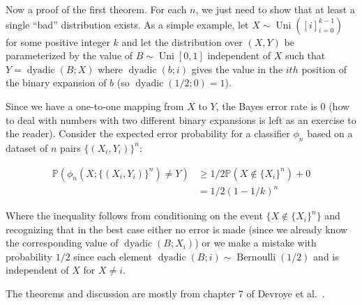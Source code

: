 \documentclass[12pt]{article}
\begin{document}
Now a proof of the first theorem. For each $n$, we just need to
show that at least a single ``bad'' distribution exists. As a simple
example, let $X \sim \operatorname{Uni}([i]_{i=0}^{k-1})$ for some
positive integer $k$ and let the distribution over $(X, Y)$ be parameterized by the
value of $B \sim \operatorname{Uni}[0, 1]$ independent of $X$ such that $Y =
\operatorname{dyadic}(B; X)$ where $\operatorname{dyadic}(b; i)$ gives
the value in the $ith$ position of the binary expansion of $b$ (so
$\operatorname{dyadic}(1/2; 0) = 1$).

Since we have a one-to-one mapping from $X$ to $Y$, the Bayes error
rate is $0$ (how to deal with numbers with two different binary
expansions is left as an exercise to the reader). Consider the
expected error probability for a classifier $\phi_n$ based on a
dataset of $n$ pairs $\{(X_i, Y_i)\}^n$:

\begin{align}
  \mathbb{P}(\phi_n(X; \{(X_i, Y_i)\}^n) \neq Y) &\geq 1/2 \mathbb{P}(X \not \in \{X_i\}^n) + 0\\
  &= 1/2 (1- 1/k)^n
\end{align}

Where the inequality follows from conditioning on the event
$\{X \not \in \{X_i\}^n\}$ and recognizing that in the best case
either no error is made (since we already know the corresponding value
of $\operatorname{dyadic}(B; X_i)$) or we make a mistake with
probability $1/2$ since each element
\(\operatorname{dyadic}(B; i) \sim \operatorname{Bernoulli}(1/2)\) and
is independent of $X$ for $X \neq i$.

The theorems and discussion are mostly from chapter 7 of Devroye et
al.~\cite{devroye-1996-pattern}.



\end{document}
